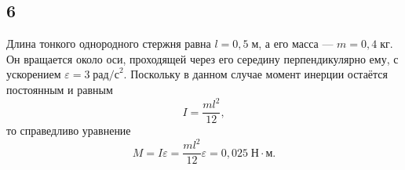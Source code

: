 \subsection{6}

Длина тонкого однородного стержня равна $l=0{,}5\;\text{м}$, а его масса --- $m=0{,}4\;\text{кг}$. Он вращается около оси, проходящей через его середину перпендикулярно ему, с ускорением $\varepsilon=3\;\text{рад/с}^2$. Поскольку в данном случае момент инерции остаётся постоянным и равным
\[
I=\frac{ml^2}{12},
\]
то справедливо уравнение
\[
M=I\varepsilon=\frac{ml^2}{12}\varepsilon=0{,}025\;\text{Н}\cdot\text{м}.
\]